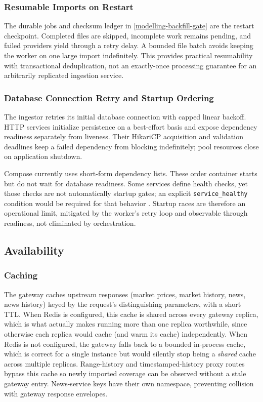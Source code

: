 \documentclass{scrartcl}
\begin{document}
\subsubsection{Resumable Imports on Restart}\label{fault-tolerance-backfill}

The durable jobs and checksum ledger in \cref{modelling-backfill-gate} are the restart checkpoint.
Completed files are skipped, incomplete work remains pending, and failed providers yield through
a retry delay. A bounded file batch avoids keeping the worker on one large import indefinitely.
This provides practical resumability with transactional deduplication, not an exactly-once
processing guarantee for an arbitrarily replicated ingestion service.

\subsubsection{Database Connection Retry and Startup Ordering}\label{fault-tolerance-retry}

The ingestor retries its initial database connection with capped linear backoff. HTTP services
initialize persistence on a best-effort basis and expose dependency readiness separately from
liveness. Their HikariCP acquisition and validation deadlines keep a failed dependency from
blocking indefinitely; pool resources close on application shutdown.

Compose currently uses short-form dependency lists. These order container starts but do not wait
for database readiness. Some services define health checks, yet those checks are not automatically
startup gates; an explicit \texttt{service\_healthy} condition would be required for that behavior
\citep{docker2026startup}. Startup races are therefore an operational limit, mitigated by the
worker's retry loop and observable through readiness, not eliminated by orchestration.

\subsection{Availability}\label{availability}

\subsubsection{Caching}\label{availability-caching}

The gateway caches upstream responses (market prices, market history, news, news history) keyed
by the request's distinguishing parameters, with a short TTL. When Redis is configured, this
cache is shared across every gateway replica, which is what actually makes running more than one
replica worthwhile, since otherwise each replica would cache (and warm its cache) independently.
When Redis is not configured, the gateway falls back to a bounded in-process cache, which is
correct for a single instance but would silently stop being a \emph{shared} cache across multiple
replicas. Range-history and timestamped-history proxy routes bypass this cache so newly imported
coverage can be observed without a stale gateway entry. News-service keys have their own
namespace, preventing collision with gateway response envelopes.
\end{document}

